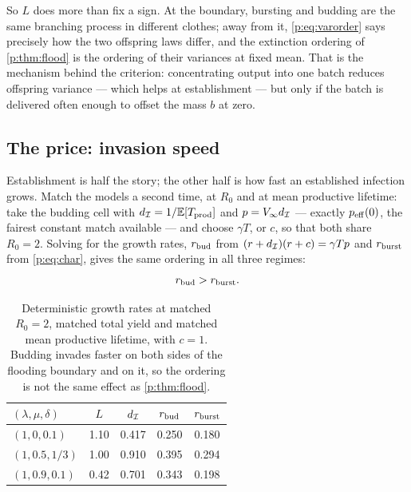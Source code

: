 \noindent
So $L$ does more than fix a sign. At the boundary, bursting and budding are
the same branching process in different clothes; away from it,
\cref{p:eq:varorder} says precisely how the two offspring laws differ, and
the extinction ordering of \cref{p:thm:flood} is the ordering of their
variances at fixed mean. That is the mechanism behind the criterion:
concentrating output into one batch reduces offspring variance --- which
helps at establishment --- but only if the batch is delivered often enough
to offset the mass $b$ at zero.

\subsection{The price: invasion speed}
\label{p:sec:tradeoff}

Establishment is half the story; the other half is how fast an established
infection grows. Match the models a second time, at $R_0$ and at mean
productive lifetime: take the budding cell with
$d_{\mathcal{I}}=1/\mathbb{E}\!\left[T_{\rm prod}\right]$ and $p=V_\infty d_{\mathcal{I}}$ --- exactly
$p_{\rm eff}(0)$, the fairest constant match available --- and choose
$\gamma T$, or $c$, so that both share $R_0=2$. Solving for the growth rates,
$r_{\rm bud}$ from $(r+d_{\mathcal{I}})(r+c)=\gamma Tp$ and $r_{\rm burst}$ from
\cref{p:eq:char}, gives the same ordering in all three regimes:
\begin{equation}
r_{\rm bud}>r_{\rm burst}.
\label{p:eq:rorder}
\end{equation}

\begin{table}[htbp]
\centering
\renewcommand{\arraystretch}{1.1}
\begin{tabular}{@{}l S[table-format=1.2]
    S[table-format=1.3]S[table-format=1.3]S[table-format=1.3]@{}}
\toprule
{$(\lambda,\mu,\delta)$} & {$L$} & {$d_{\mathcal{I}}$}
 & {$r_{\rm bud}$} & {$r_{\rm burst}$} \\
\midrule
$(1,0,0.1)$   & 1.10 & 0.417 & 0.250 & 0.180 \\
$(1,0.5,1/3)$ & 1.00 & 0.910 & 0.395 & 0.294 \\
$(1,0.9,0.1)$ & 0.42 & 0.701 & 0.343 & 0.198 \\
\bottomrule
\end{tabular}
\caption{Deterministic growth rates at matched $R_0=2$, matched total yield
and matched mean productive lifetime, with $c=1$. Budding invades faster on
both sides of the flooding boundary and on it, so the ordering is not the
same effect as \cref{p:thm:flood}.}
\label{p:tab:tradeoff}
\end{table}

